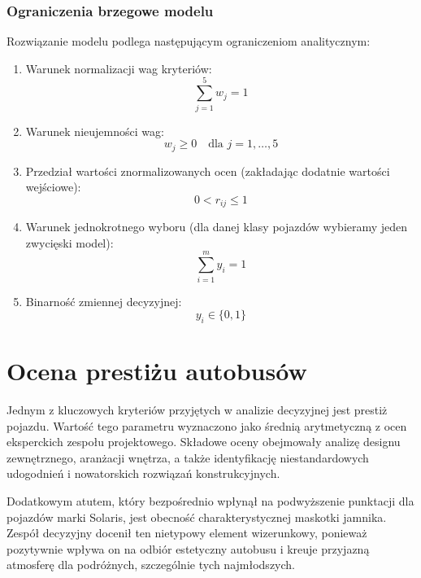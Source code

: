 \subsubsection*{Ograniczenia brzegowe modelu}
Rozwiązanie modelu podlega następującym ograniczeniom analitycznym:

\begin{enumerate}
    \item Warunek normalizacji wag kryteriów:
    \begin{equation}
    \sum_{j=1}^{5} w_j = 1
    \end{equation}
    \item Warunek nieujemności wag:
    \begin{equation}
    w_j \ge 0 \quad \text{dla } j=1,\dots,5
    \end{equation}
    \item Przedział wartości znormalizowanych ocen (zakładając dodatnie wartości wejściowe):
    \begin{equation}
    0 < r_{ij} \le 1
    \end{equation}
    \item Warunek jednokrotnego wyboru (dla danej klasy pojazdów wybieramy jeden zwycięski model):
    \begin{equation}
    \sum_{i=1}^{m} y_i = 1
    \end{equation}
    \item Binarność zmiennej decyzyjnej:
    \begin{equation}
    y_i \in \{0, 1\}
    \end{equation}
\end{enumerate}

\section{Ocena prestiżu autobusów}\label{sec:bus_prestige}

Jednym z kluczowych kryteriów przyjętych w analizie decyzyjnej jest prestiż pojazdu. Wartość tego parametru wyznaczono jako średnią arytmetyczną z ocen eksperckich zespołu projektowego. Składowe oceny obejmowały analizę designu zewnętrznego, aranżacji wnętrza, a także identyfikację niestandardowych udogodnień i nowatorskich rozwiązań konstrukcyjnych.

Dodatkowym atutem, który bezpośrednio wpłynął na podwyższenie punktacji dla pojazdów marki Solaris, jest obecność charakterystycznej maskotki jamnika. Zespół decyzyjny docenił ten nietypowy element wizerunkowy, ponieważ pozytywnie wpływa on na odbiór estetyczny autobusu i kreuje przyjazną atmosferę dla podróżnych, szczególnie tych najmłodszych.

